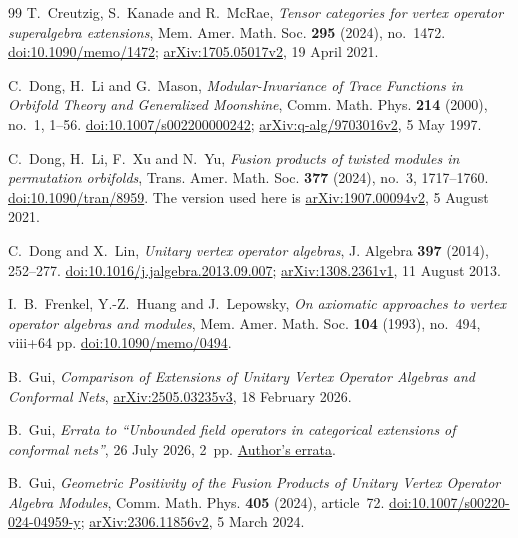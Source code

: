 \begin{thebibliography}{99}
T.~Creutzig, S.~Kanade and R.~McRae,
\emph{Tensor categories for vertex operator superalgebra extensions},
Mem. Amer. Math. Soc. \textbf{295} (2024), no.~1472.
\href{https://doi.org/10.1090/memo/1472}{doi:10.1090/memo/1472};
\href{https://arxiv.org/abs/1705.05017v2}{arXiv:1705.05017v2},
19 April 2021.

C.~Dong, H.~Li and G.~Mason,
\emph{Modular-Invariance of Trace Functions in Orbifold Theory and Generalized Moonshine},
Comm. Math. Phys. \textbf{214} (2000), no.~1, 1--56.
\href{https://doi.org/10.1007/s002200000242}{doi:10.1007/s002200000242};
\href{https://arxiv.org/abs/q-alg/9703016v2}{arXiv:q-alg/9703016v2},
5 May 1997.

C.~Dong, H.~Li, F.~Xu and N.~Yu,
\emph{Fusion products of twisted modules in permutation orbifolds},
Trans. Amer. Math. Soc. \textbf{377} (2024), no.~3, 1717--1760.
\href{https://doi.org/10.1090/tran/8959}{doi:10.1090/tran/8959}.
The version used here is
\href{https://arxiv.org/abs/1907.00094v2}{arXiv:1907.00094v2},
5 August 2021.

C.~Dong and X.~Lin,
\emph{Unitary vertex operator algebras},
J. Algebra \textbf{397} (2014), 252--277.
\href{https://doi.org/10.1016/j.jalgebra.2013.09.007}{doi:10.1016/j.jalgebra.2013.09.007};
\href{https://arxiv.org/abs/1308.2361v1}{arXiv:1308.2361v1},
11 August 2013.

I.~B.~Frenkel, Y.-Z.~Huang and J.~Lepowsky,
\emph{On axiomatic approaches to vertex operator algebras and modules},
Mem. Amer. Math. Soc. \textbf{104} (1993), no.~494, viii+64 pp.
\href{https://doi.org/10.1090/memo/0494}{doi:10.1090/memo/0494}.

B.~Gui,
\emph{Comparison of Extensions of Unitary Vertex Operator Algebras and Conformal Nets},
\href{https://arxiv.org/abs/2505.03235v3}{arXiv:2505.03235v3},
18 February 2026.

B.~Gui,
\emph{Errata to ``Unbounded field operators in categorical extensions
of conformal nets''}, 26 July 2026, 2~pp.
\href{https://binguimath.github.io/Files/Errata/2020_Strong-Braiding_Errata.pdf}
{Author's errata}.

B.~Gui,
\emph{Geometric Positivity of the Fusion Products of Unitary Vertex Operator Algebra Modules},
Comm. Math. Phys. \textbf{405} (2024), article~72.
\href{https://doi.org/10.1007/s00220-024-04959-y}{doi:10.1007/s00220-024-04959-y};
\href{https://arxiv.org/abs/2306.11856v2}{arXiv:2306.11856v2},
5 March 2024.


\end{thebibliography}
